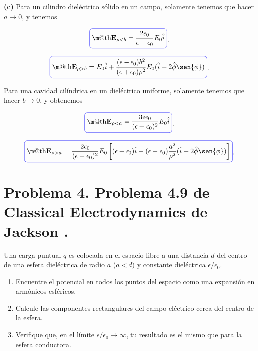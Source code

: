 \documentclass[a4paper,11pt]{article}
\makeatletter
\numberwithin{equation}{section}
\newcommand*{\boxcolor}{blue}
\renewcommand{\boxed}[1]{\textcolor{\boxcolor}{%
\tikz[baseline={([yshift=-1ex]current bounding box.center)}] \node [rectangle, minimum width=1ex,rounded corners,draw] {\normalcolor\m@th$\displaystyle#1$};}}
\makeatother
\begin{document}
\textbf{(c)} Para un cilindro dieléctrico sólido en un campo, solamente tenemos que 
hacer $a \rightarrow 0$, y tenemos 

\begin{equation}
 \boxed{\mathbf{E}_{\rho < b} = \frac{2\epsilon_0}{\epsilon + \epsilon_0}E_0 \hat{i}},
\end{equation}

\begin{equation}
 \boxed{ \mathbf{E}_{\rho > b} = E_0\hat{i} + \frac{(\epsilon - \epsilon_0)b^2}
 {(\epsilon + \epsilon_0)\rho^2}E_0(\hat{i} + 2\hat{\phi}\sen{\phi})}.
\end{equation}

Para una cavidad cilíndrica en un dieléctrico uniforme, solamente tenemos que 
hacer $b \rightarrow 0$, y obtenemos 

\begin{equation}
 \boxed{\mathbf{E}_{\rho < a} = \frac{3\epsilon\epsilon_0}{(\epsilon + \epsilon_0)^2}
 E_0 \hat{i}},
\end{equation}

\begin{equation}
 \boxed{\mathbf{E}_{\rho > a} = \frac{2\epsilon_0}{(\epsilon + \epsilon_0)^2}E_0 
 \left[(\epsilon + \epsilon_0)\hat{i} - (\epsilon - \epsilon_0)\frac{a^2}{\rho^2}
 (\hat{i} + 2\hat{\phi}\sen{\phi})\right]}.
\end{equation}

\newpage

\section{Problema 4. Problema 4.9 de Classical Electrodynamics
de Jackson \cite{jackson}.}

Una carga puntual $q$ es colocada en el espacio libre a una distancia $d$ del centro 
de una esfera dieléctrica de radio $a$ ($a < d)$ y constante dieléctrica 
$\epsilon/\epsilon_0$. 

\begin{enumerate}[label=\textbf{(\alph*)}]
\item Encuentre el potencial en todos los puntos del espacio como una expansión 
en armónicos esféricos.
\item Calcule las componentes rectangulares del campo eléctrico cerca del 
centro de la esfera.
\item Verifique que, en el límite $\epsilon/\epsilon_0 \rightarrow \infty$, tu 
resultado es el mismo que para la esfera conductora.
\end{enumerate}
\end{document}
